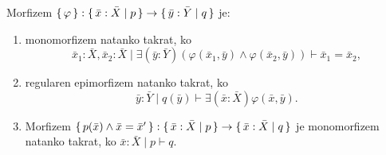 \documentclass[../kategoricna_logika.tex]{subfiles}
\begin{document}
\begin{lema}\label{lema:morfizmi-v-sintakticni-kategoriji}
  Morfizem
  $\lbrace\,\varphi\,\rbrace : \lbrace\,\bar{x}:\bar{X} \mid  p\,\rbrace \to
  \lbrace\,\bar{y}:\bar{Y} \mid  q\,\rbrace$ je:
  \begin{enumerate}[label=(\roman*)]
  \item monomorfizem natanko takrat, ko
      $$\bar{x}_1:\bar{X},\bar{x}_{2}:\bar{X} \mid \exists (\bar{y}:\bar{Y}) \left( \varphi(\bar{x}_1,\bar{y}) \wedge \varphi(\bar{x}_2,\bar{y}) \right) \vdash \bar{x}_1 = \bar{x}_2 ,$$
    \item regularen epimorfizem natanko takrat, ko
      $$\bar{y}:\bar{Y} \mid  q(\bar{y}) \vdash \exists (\bar{x}:\bar{X}) \varphi(\bar{x},\bar{y}).$$
    \item Morfizem
      $\lbrace\,p(\bar{x}) \wedge \bar{x} = \bar{x}'\,\rbrace :
      \lbrace\,\bar{x}:\bar{X} \mid  p \,\rbrace \to \lbrace\,\bar{x}:\bar{X} \mid  q\,\rbrace$ je
      monomorfizem natanko takrat, ko $\bar{x}:\bar{X} \mid p \vdash q$.
    \end{enumerate}
  \end{lema}
\end{document}
